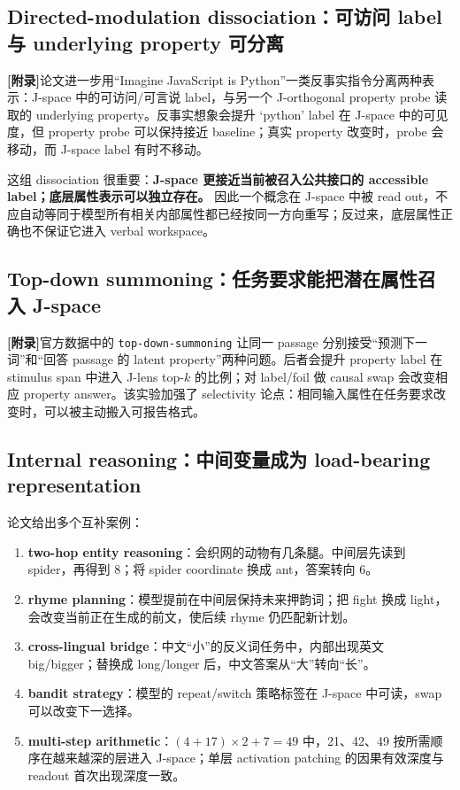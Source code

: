 \documentclass[10.5pt,a4paper]{ctexart}
\newcommand{\AppendixTag}{\textbf{[附录]}}
\begin{document}
\subsection{Directed-modulation dissociation：可访问 label 与 underlying property 可分离}
\AppendixTag 论文进一步用“Imagine JavaScript is Python”一类反事实指令分离两种表示：J-space 中的可访问/可言说 label，与另一个 J-orthogonal property probe 读取的 underlying property。反事实想象会提升 `python' label 在 J-space 中的可见度，但 property probe 可以保持接近 baseline；真实 property 改变时，probe 会移动，而 J-space label 有时不移动。

这组 dissociation 很重要：\textbf{J-space 更接近当前被召入公共接口的 accessible label；底层属性表示可以独立存在。} 因此一个概念在 J-space 中被 read out，不应自动等同于模型所有相关内部属性都已经按同一方向重写；反过来，底层属性正确也不保证它进入 verbal workspace。

\subsection{Top-down summoning：任务要求能把潜在属性召入 J-space}
\AppendixTag 官方数据中的 \texttt{top-down-summoning} 让同一 passage 分别接受“预测下一词”和“回答 passage 的 latent property”两种问题。后者会提升 property label 在 stimulus span 中进入 J-lens top-$k$ 的比例；对 label/foil 做 causal swap 会改变相应 property answer。该实验加强了 selectivity 论点：相同输入属性在任务要求改变时，可以被主动搬入可报告格式。

\subsection{Internal reasoning：中间变量成为 load-bearing representation}
论文给出多个互补案例：
\begin{enumerate}
\item \textbf{two-hop entity reasoning}：会织网的动物有几条腿。中间层先读到 spider，再得到 8；将 spider coordinate 换成 ant，答案转向 6。
\item \textbf{rhyme planning}：模型提前在中间层保持未来押韵词；把 fight 换成 light，会改变当前正在生成的前文，使后续 rhyme 仍匹配新计划。
\item \textbf{cross-lingual bridge}：中文“小”的反义词任务中，内部出现英文 big/bigger；替换成 long/longer 后，中文答案从“大”转向“长”。
\item \textbf{bandit strategy}：模型的 repeat/switch 策略标签在 J-space 中可读，swap 可以改变下一选择。
\item \textbf{multi-step arithmetic}：$(4+17)\times 2+7=49$ 中，21、42、49 按所需顺序在越来越深的层进入 J-space；单层 activation patching 的因果有效深度与 readout 首次出现深度一致。
\end{enumerate}
\end{document}
